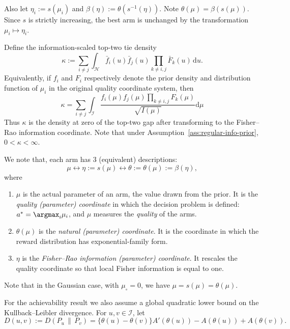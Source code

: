 \documentclass[10pt]{article}
\newcommand{\dd}{\mathrm{d}}
\theoremstyle{plain}
\begin{document}
Also let $\eta_i:=s(\mu_i)$ and $\beta(\eta):=\theta(s^{-1}(\eta))$. Note $\theta(\mu)=\beta(s(\mu))$. Since \(s\) is strictly increasing, the best arm is unchanged by the
transformation \(\mu_i\mapsto \eta_i\). 


\begingroup
\renewcommand{\thesection}{4}
\AssRegularInfoPrior*
\endgroup

Define the information-scaled top-two tie density
\begin{equation}
\label{eq:kappa-transfer-upper}
    \kappa
    :=
    \sum_{i\neq j}
    \int_{\mathcal H}
        \bar f_i(u)\bar f_j(u)
        \prod_{k\neq i,j}\bar F_k(u)
    \,\dd u .
\end{equation}
Equivalently, if \(f_i\) and \(F_i\) respectively denote the prior density and distribution function
of \(\mu_i\) in the original quality coordinate system, then $$
\kappa = \sum_{i \neq j} \int_{\mathcal I} \frac{f_i(\mu)f_j(\mu)\prod_{k\neq i,j}{F_k(\mu)}}{\sqrt{I(\mu)}}  \dd\mu
$$
Thus \(\kappa\) is the density at zero of the top-two gap after transforming to
the Fisher--Rao information coordinate. Note that under Assumption~\ref{ass:regular-info-prior},
\(0<\kappa<\infty\). 

\begin{remark} We note that, each arm has 3 (equivalent) descriptions:
$$
\mu \leftrightarrow \eta :=s(\mu) \leftrightarrow \theta := \theta(\mu) := \beta(\eta),
$$
where \begin{enumerate}
    \item $\mu$ is the actual parameter of an arm, the value drawn from the prior. It is the \emph{quality (parameter) coordinate} in which the decision problem is defined: $a^*=\argmax_i \mu_i$, and $\mu$ measures the \emph{quality} of the arms.

    \item $\theta(\mu)$ is the \emph{natural (parameter) coordinate}. It is the coordinate in which the reward distribution has exponential-family form.

    \item $\eta$ is the \emph{Fisher--Rao information (parameter) coordinate}. It rescales the quality coordinate so that local Fisher information is equal to one.
\end{enumerate}

Note that in the Gaussian case, with $\mu_\circ=0$, we have $\mu=s(\mu)=\theta(\mu)$.
\end{remark}

For the achievability result we also assume a global quadratic lower bound on
the Kullback--Leibler divergence. For \(u,v\in\mathcal I\), let
\[
    D(u,v)
    :=
    D(P_u\,\|\,P_v)
    =
    \{\theta(u)-\theta(v)\}A'(\theta(u))
    -
    A(\theta(u))
    +
    A(\theta(v)).
\]
\end{document}
